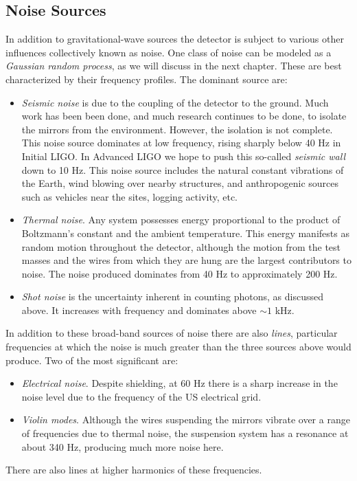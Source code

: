 \subsection{Noise Sources}
\label{sec:noise_sources}

In addition to gravitational-wave sources the detector is subject to
various other influences collectively known as noise.  One class of
noise can be modeled as a \emph{Gaussian random process}, as we will
discuss in the next chapter.  These are best characterized by their
frequency profiles.  The dominant source are:
%
\begin{itemize} 
\item \emph{Seismic noise} is due to the coupling of the
detector to the ground.  Much work has been been done, and much
research continues to be done, to isolate the mirrors from the
environment.  However, the isolation is not complete.  This noise
source dominates at low frequency, rising sharply below 40 Hz in
Initial LIGO.  In Advanced LIGO we hope to push this so-called
\emph{seismic wall} down to 10 Hz.  This noise source includes the
natural constant vibrations of the Earth, wind blowing over nearby
structures, and anthropogenic sources such as vehicles near the sites,
logging activity, etc.

\item \emph{Thermal noise}. Any system possesses energy proportional
to the product of Boltzmann's constant and the ambient temperature.
This energy manifests as random motion throughout the detector,
although the motion from the test masses and the wires from which they
are hung are the largest contributors to noise.  The noise produced
dominates from 40 Hz to approximately 200 Hz.

\item \emph{Shot noise} is the uncertainty inherent in counting
photons, as discussed above.  It increases with frequency and
dominates above $\sim 1$ kHz.

\end{itemize}
%
In addition to these broad-band sources of noise there are also
\emph{lines}, particular frequencies at which the noise is much
greater than the three sources above would produce.  Two of the most
significant are:
%
\begin{itemize}
\item \emph{Electrical noise}.  Despite shielding, at 60 Hz there is a
sharp increase in the noise level due to the frequency of the US
electrical grid.
\item \emph{Violin modes}.  Although the wires suspending the mirrors
vibrate over a range of frequencies due to thermal noise, the
suspension system has a resonance at about 340 Hz, producing much
more noise here.
\end{itemize}
%
There are also lines at higher harmonics of these frequencies.

